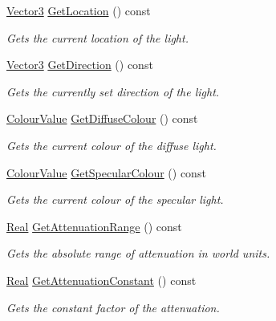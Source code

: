 \begin{DoxyCompactItemize}
\hyperlink{classphys_1_1Vector3}{Vector3} \hyperlink{classphys_1_1Light_ad3610013689db17cb21e89af2786fb3d}{GetLocation} () const 
\begin{DoxyCompactList}\small\item\em Gets the current location of the light. \item\end{DoxyCompactList}\item 
\hyperlink{classphys_1_1Vector3}{Vector3} \hyperlink{classphys_1_1Light_afde81fca535417fdb33d23d38117ccac}{GetDirection} () const 
\begin{DoxyCompactList}\small\item\em Gets the currently set direction of the light. \item\end{DoxyCompactList}\item 
\hyperlink{classphys_1_1ColourValue}{ColourValue} \hyperlink{classphys_1_1Light_a75d4d4c33bf0f552e48f280a80dc5fb4}{GetDiffuseColour} () const 
\begin{DoxyCompactList}\small\item\em Gets the current colour of the diffuse light. \item\end{DoxyCompactList}\item 
\hyperlink{classphys_1_1ColourValue}{ColourValue} \hyperlink{classphys_1_1Light_a05c7ab32ddb1acf71a041098fbb9ff35}{GetSpecularColour} () const 
\begin{DoxyCompactList}\small\item\em Gets the current colour of the specular light. \item\end{DoxyCompactList}\item 
\hyperlink{namespacephys_af7eb897198d265b8e868f45240230d5f}{Real} \hyperlink{classphys_1_1Light_ad113608997af66646ed91c28acb9057c}{GetAttenuationRange} () const 
\begin{DoxyCompactList}\small\item\em Gets the absolute range of attenuation in world units. \item\end{DoxyCompactList}\item 
\hyperlink{namespacephys_af7eb897198d265b8e868f45240230d5f}{Real} \hyperlink{classphys_1_1Light_aad30f7fb932b030de7eb15046dea83a7}{GetAttenuationConstant} () const 
\begin{DoxyCompactList}\small\item\em Gets the constant factor of the attenuation. \item\end{DoxyCompactList}\item 

\end{DoxyCompactItemize}
